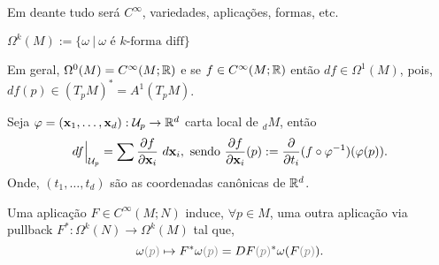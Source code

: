 
\begin{note}
    Em deante tudo será \(C^\infty\), variedades, aplicações, formas, etc. 
\end{note}

\begin{definition}
    \centering \(\Omega^k(M):= \{ \omega \ | \ \omega \text{ é } k\text{-forma diff}\}\)  
\end{definition}


\begin{note}
    Em geral, \(\Omega^0(M)=C^\infty(M;\mathbb{R})\) e se \(f \in C^\infty(M; \mathbb{R})\) então \(df \in \Omega^1(M)\), pois, \(df(p)\in (T_pM)^* = A^1(T_pM)\).    
\end{note}

\begin{exercise}
    Seja \(\varphi = (\textbf{x}_1, \ldots, \textbf{x}_d) : \mathcal{U}_p \to \mathbb{R}^d\) carta local de \(_dM\), então 
    \[df\Big|_{\mathcal{U}_p} = \sum \frac{\partial f }{\partial \textbf{x}_i} \ d\textbf{x}_i, \ \text{sendo }  \frac{\partial f }{\partial \textbf{x}_i}(p) := \frac{\partial }{\partial t_i} (f\circ \varphi^{-1})(\varphi(p)).\]
    Onde, \((t_1, \ldots, t_d)\) são as coordenadas canônicas de \(\mathbb{R}^d\).  
\end{exercise}


\begin{proposition}
    Uma aplicação \(F\in C^\infty(M;N)\) induce, \(\forall p \in M\), uma outra aplicação via pullback \(F^*: \Omega^k(N) \to \Omega^k(M)\)  tal que, 
    \[  \omega\textcolor{gray}{(p)} \mapsto F^*\omega \textcolor{gray}{(p)} = DF\textcolor{gray}{(p)}^*\omega(F\textcolor{gray}{(p)}).\] 
\end{proposition}
\vspace{-0.4cm}

